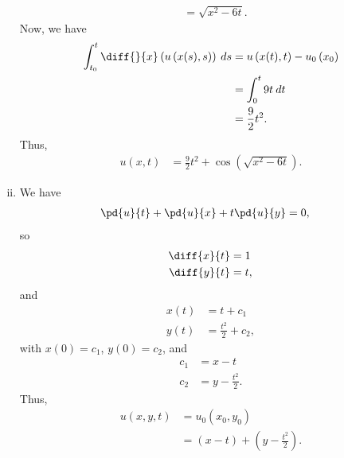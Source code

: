 \documentclass[10pt]{mypackage}
\begin{document}
\begin{solution}
\begin{enumerate}[(i)]
\begin{align*}
             &= \sqrt{x^2 - 6t}.
      \end{align*}
      Now, we have
      \begin{align*}
        \int_{t_0}^{t} \diff{}{x}\left( u\left( x(s),s \right) \right)\:ds &= u\left( x(t),t \right)-u_0\left( x_0 \right)\\
                                                                           &= \int_{0}^{t} 9t\:dt\\
                                                                           &= \frac{9}{2}t^2.
      \end{align*}
      Thus,
      \begin{align*}
        u\left( x,t \right) &= \frac{9}{2}t^2 + \cos\left( \sqrt{x^2-6t} \right).
      \end{align*}
    \item We have
      \begin{align*}
        \pd{u}{t} + \pd{u}{x} + t\pd{u}{y} &= 0,
      \end{align*}
      so
      \begin{align*}
        \diff{x}{t} &= 1\\
        \diff{y}{t} &= t,
      \end{align*}
      and
      \begin{align*}
        x(t) &= t+c_1\\
        y(t) &= \frac{t^2}{2} + c_2,
      \end{align*}
      with $x(0) = c_1$, $y(0) = c_2$, and
      \begin{align*}
        c_1 &= x-t\\
        c_2 &= y-\frac{t^2}{2}.
      \end{align*}
      Thus,
      \begin{align*}
        u\left( x,y,t \right) &= u_0\left( x_0,y_0 \right)\\
                              &= \left( x-t \right) + \left( y-\frac{t^2}{2} \right).
      \end{align*}
  \end{enumerate}
\end{solution}
\end{document}
